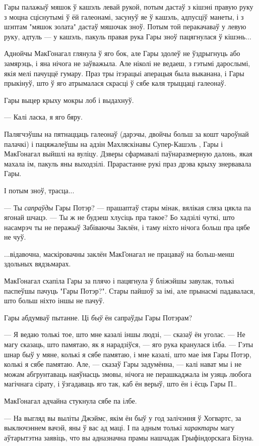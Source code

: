 Гары палажыў мяшок ў кашэль левай рукой, потым дастаў з кішэні правую руку з моцна сціснутымі ў ёй 
галеонамі, засунуў яе ў кашэль, адпусціў манеты, і з шэптам "мяшок золата" дастаў мяшочак зноў.
Потым той перакачаваў у левую руку, адтуль --- у кашэль, пакуль правая рука Гары зноў пацягнулася 
ў кішэнь...

Аднойчы МакГонагал глянула ў яго бок, але Гары здолеў не ўздрыгнуць або замярэць, і яна нічога
не заўважыла. Але ніколі не ведаеш, з гэтымі дарослымі, якія мелі пачуццё гумару. Праз тры ітэрацыі 
аперацыя была выканана, і Гары прыкінуў, што ў яго атрымалася скрасці ў сябе каля 
трыццаці галеонаў.

Гары выцер крыху мокры лоб і выдахнуў.

--- Калі ласка, я яго бяру.

Палягчэўшы на пятнаццаць галеонаў (дарэчы, двойчы больш за кошт чароўнай палачкі) і пацяжалеўшы на
адзін Махляскінавы Супер-Кашэль , Гары і МакГонагал выйшлі на вуліцу. Дзверы сфармавалі 
паўнаразмерную далонь, якая махала ім, пакуль яны выходзілі. Прарастанне рукі праз дрэва крыху 
знервавала Гары.

І потым зноў, трасца...

--- Ты \emph{сапраўды} Гары Потэр? --- прашаптаў стары мінак, вялікая сляза цякла па ягонай шчацэ. 
--- Ты ж не будзеш хлусіць пра такое? Бо хадзілі чуткі, што насамрэч ты не перажыў Забіваючы
Заклён, і таму ніхто нічога больш пра цябе не чуў.

...відавочна, маскіровачны заклён МакГонагал не працаваў на больш-менш здольных вядзьмарах.

МакГонагал схапіла Гары за плячо і пацягнула ў бліжэйшы завулак, толькі паспеўшы пачуць
"Гары Потэр?". Стары пайшоў за імі, але прынасмі падавалася, што больш ніхто іншы не пачуў.

Гары абдумваў пытанне. Ці \emph{быў} ён сапраўды Гары Потэрам? 

--- Я ведаю толькі тое, што мне казалі іншы людзі, --- сказаў ён уголас. --- Не магу сказаць, што
памятаю, як я нарадзіўся, --- яго рука кранулася ілба. --- Гэты шнар быў у мяне, колькі
я сябе памятаю, і мне казалі, што мае імя Гары Потэр, колькі я сябе памятаю. Але, ---
сказаў Гары задумённа, --- калі нават мы і не можам абгрунтаваць наяўнасць змовы, нічога 
не перашкаджала ім узяць любога магічнага сірату, і ўзгадаваць яго так, каб ён верыў, што 
ён і ёсць Гары П..

МакГонагал адчайна стукнула сябе па ілбе.

--- На выгляд вы выліты Джэймс, якім ён быў у год залічэння ў Хогвартс, за выключэннем
вачэй, яны ў вас ад маці. І па адным толькі \emph{характары} магу аўтарытэтна заявіць, 
что вы адназначна прамы нашчадак Грыфіндорскага Бізуна.

